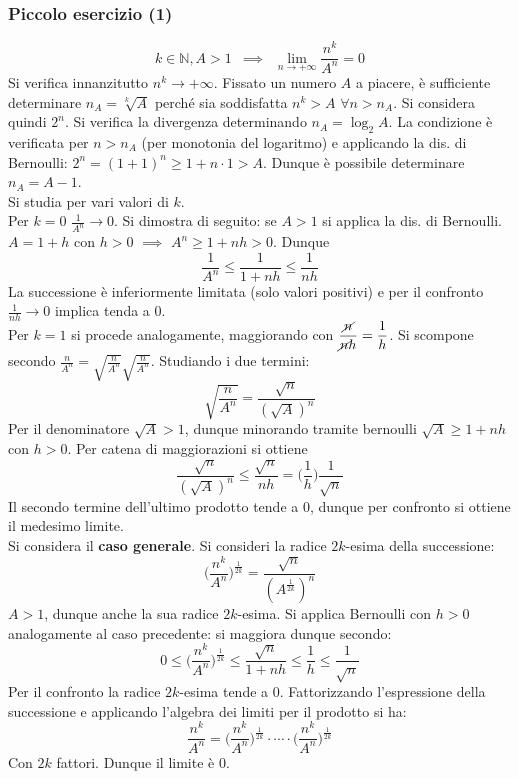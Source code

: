 \documentclass[10pt, oneside]{book}
\theoremstyle{plain}
\begin{document}
\subsubsection*{Piccolo esercizio (1)}
\[k \in \mathbb{N}, A > 1 \enspace \implies \enspace \lim \limits_{n \rightarrow + \infty} \frac{n^k}{A^n} = 0\]
Si verifica innanzitutto $n^k \rightarrow +\infty$. Fissato un numero $A$ a piacere, è sufficiente determinare $n_A = \sqrt[k]{A}$ perché sia soddisfatta $n^k > A$ $\forall n > n_A$. Si considera quindi $2^n$. Si verifica la divergenza determinando $n_A = \log_2A$. La condizione è verificata per $n > n_A$ (per monotonia del logaritmo) e applicando la dis. di Bernoulli: $2^n = (1+1)^n \geq 1 + n\cdot 1 > A$. Dunque è possibile determinare $n_A = A -1$.
\\Si studia per vari valori di $k$.
\\Per $k=0$ $\displaystyle \frac{1}{A^n} \rightarrow 0$. Si dimostra di seguito: se $A>1$ si applica la dis. di Bernoulli. $A = 1+h$ con $h>0$ $\displaystyle \implies$ $A^n \geq 1 + nh > 0$. Dunque
\[\frac{1}{A^n} \leq \frac{1}{1+nh} \leq \frac{1}{nh}\]
La successione è inferiormente limitata (solo valori positivi) e per il confronto $\displaystyle \frac{1}{nh} \rightarrow 0$ implica tenda a 0.
\\Per $k=1$ si procede analogamente, maggiorando con $\displaystyle \frac{\cancel{n}}{\cancel{n}h} = \frac{1}{h}$. Si scompone secondo $\displaystyle \frac{n}{A^n} = \sqrt{\frac{n}{A^n}}\sqrt{\frac{n}{A^n}}$. Studiando i due termini:
\[\sqrt{\frac{n}{A^n}} = \frac{\sqrt{n}}{(\sqrt{A})^n}\]
Per il denominatore $\sqrt{A} > 1$, dunque minorando tramite bernoulli $\sqrt{A} \geq 1 + nh$ con $h>0$. Per catena di maggiorazioni si ottiene
\[\frac{\sqrt{n}}{(\sqrt{A})^n} \leq \frac{\sqrt{n}}{nh} = \bigg(\frac{1}{h}\bigg) \frac{1}{\sqrt{n}}\]
Il secondo termine dell'ultimo prodotto tende a 0, dunque per confronto si ottiene il medesimo limite.
\\Si considera il \textbf{caso generale}. Si consideri la radice $2k$-esima della successione: 
\[\bigg(\frac{n^k}{A^n}\bigg)^{\frac{1}{2k}} = \frac{\sqrt{n}}{(A^{\frac{1}{2k}})^n}\]
$A > 1$, dunque anche la sua radice $2k$-esima. Si applica Bernoulli con $h >0$ analogamente al caso precedente: si maggiora dunque secondo:
\[0 \leq \bigg(\frac{n^k}{A^n}\bigg)^{\frac{1}{2k}} \leq \frac{\sqrt{n}}{1 + nh} \leq \frac{1}{h} \leq \frac{1}{\sqrt{n}}\]
Per il confronto la radice $2k$-esima tende a 0. Fattorizzando l'espressione della successione e applicando l'algebra dei limiti per il prodotto si ha:
\[\frac{n^k}{A^n} = \bigg(\frac{n^k}{A^n}\bigg)^{\frac{1}{2k}} \cdot \cdots \cdot \bigg(\frac{n^k}{A^n}\bigg)^{\frac{1}{2k}}\]
Con $2k$ fattori. Dunque il limite è 0.
\end{document}
